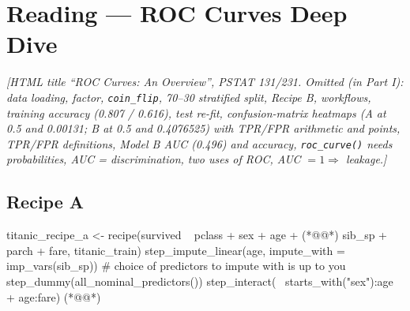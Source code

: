 \section{Reading --- ROC Curves Deep Dive}
%
{\color{figgray}\itshape [HTML title ``ROC Curves: An Overview'', PSTAT 131/231. Omitted (in Part I): data loading,
factor, \texttt{coin\_flip}, 70--30 stratified split, Recipe B, workflows, training accuracy (0.807 / 0.616), test re-fit,
confusion-matrix heatmaps (A at 0.5 and 0.00131; B at 0.5 and 0.4076525) with TPR/FPR arithmetic and points,
TPR/FPR definitions, Model B AUC (0.496) and accuracy, \texttt{roc\_curve()} needs probabilities,
AUC = discrimination, two uses of ROC, AUC $=1\Rightarrow$ leakage.]}

\subsection{Recipe A}
\begin{rcode}
titanic_recipe_a <- recipe(survived ~ pclass + sex + age +   (*@@*)
                           sib_sp + parch + fare, titanic_train) %
  step_impute_linear(age, impute_with = imp_vars(sib_sp)) %
  # choice of predictors to impute with is up to you
  step_dummy(all_nominal_predictors()) %
  step_interact(~ starts_with("sex"):age + age:fare)  (*@@*)
\end{rcode}

